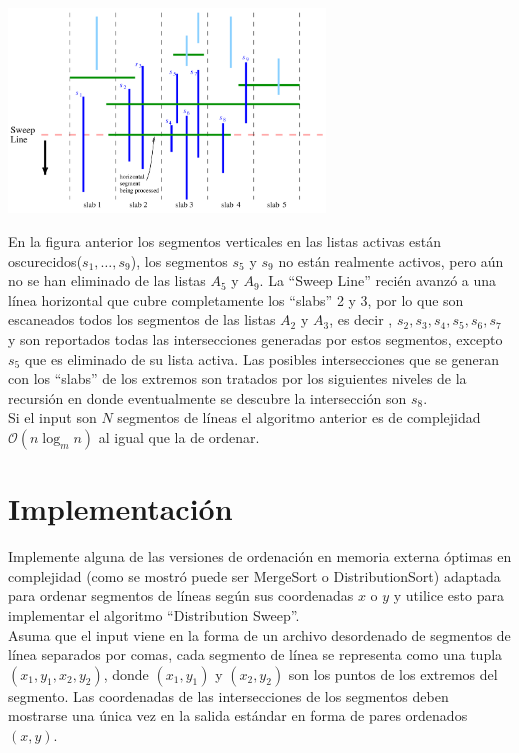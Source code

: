 \documentclass[dcc,uchile]{fcfmcourse}
\begin{document}
\begin{center}
\includegraphics[width=0.63\textwidth]{imagenes/DistributionSweep.png}
\end{center}
En la figura anterior los segmentos verticales en las listas activas están oscurecidos($s_{1},\ldots, s_{9}$), los segmentos $s_{5}$ y $s_{9}$ no están realmente activos, pero aún no se han eliminado de las listas $A_{5}$ y $A_{9}$. La ``Sweep Line'' recién avanzó a una línea horizontal que cubre completamente los ``slabs'' 2 y 3, por lo que son escaneados todos los segmentos de las listas $A_{2}$ y $A_{3}$, es decir , $s_{2}, s_{3}, s_{4}, s_{5}, s_{6}, s_{7}$ y son reportados todas las intersecciones generadas por estos segmentos, excepto $s_{5}$ que es eliminado de su lista activa. Las posibles intersecciones que se generan con los ``slabs'' de los extremos son tratados por los siguientes niveles de la recursión en donde eventualmente se descubre la intersección son $s_{8}$.\\

Si el input son $N$ segmentos de líneas el algoritmo anterior es de complejidad $\mathcal{O}(n\log_{m}n)$ al igual que la de ordenar.
\section{Implementación}

Implemente alguna de las versiones de ordenación en memoria externa óptimas en complejidad (como se mostró puede ser MergeSort o DistributionSort) adaptada para ordenar segmentos de líneas según sus coordenadas $x$ o $y$  y utilice esto para implementar el algoritmo ``Distribution Sweep''.\\
Asuma que el input viene en la forma de un archivo desordenado de segmentos de línea separados por comas, cada segmento de línea se representa como una tupla $(x_{1}, y_{1}, x_{2}, y_{2})$, donde $(x_{1}, y_{1})$ y $(x_{2}, y_{2})$ son los puntos de los extremos del segmento. Las coordenadas de las intersecciones de los segmentos deben mostrarse una única vez en la salida estándar en forma de pares ordenados $(x,y)$.
\end{document}
